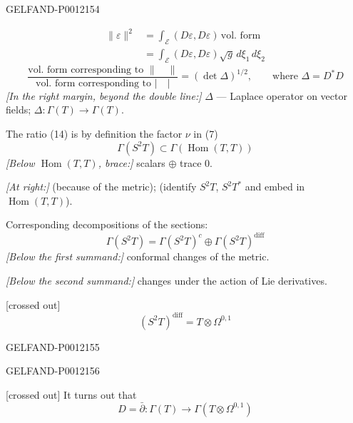 \begin{GelfandAdjacentEvidence}{GELFAND-P001215}{4}

\begin{equation*}
\begin{aligned}
\|\varepsilon\|^2
&=\int_{\mathcal E}(D\varepsilon,D\varepsilon)\,\text{vol. form}\\
&=\int_{\mathcal E}(D\varepsilon,D\varepsilon)\sqrt g\,d\xi_1\,d\xi_2
\end{aligned}\tag{13}
\end{equation*}
\begin{equation*}
\frac{\text{vol. form corresponding to }\|\quad\|}{\text{vol. form corresponding to }\lvert\quad\rvert}
=(\det\Delta)^{1/2},\qquad\text{where }\Delta=D^*D\tag{14}
\end{equation*}
\textit{[In the right margin, beyond the double line:]} \(\Delta\) --- Laplace operator on vector fields;
\(\Delta:\Gamma(T)\to\Gamma(T)\).

The ratio (14) is by definition the factor \(\nu\) in (7)
\[
\Gamma(S^2T)\subset\Gamma(\operatorname{Hom}(T,T))
\]
\textit{[Below \(\operatorname{Hom}(T,T)\), brace:]} scalars \(\oplus\) trace 0.

\textit{[At right:]} (because of the metric); (identify \(S^2T\), \(S^2T^*\) and embed in \(\operatorname{Hom}(T,T)\)).

Corresponding decompositions of the sections:
\begin{equation*}
\Gamma(S^2T)=\Gamma(S^2T)^c\oplus\Gamma(S^2T)^{\mathrm{diff}}\tag{15}
\end{equation*}
\textit{[Below the first summand:]} conformal changes of the metric.

\textit{[Below the second summand:]} changes under the action of Lie derivatives.

[crossed out]
\begin{equation*}
(S^2T)^{\mathrm{diff}}=T\otimes\Omega^{0,1}\tag{16}
\end{equation*}
\end{GelfandAdjacentEvidence}
\begin{GelfandAdjacentEvidence}{GELFAND-P001215}{5}

\end{GelfandAdjacentEvidence}
\begin{GelfandAdjacentEvidence}{GELFAND-P001215}{6}


[crossed out] It turns out that
\begin{equation*}
D=\bar\partial:\Gamma(T)\longrightarrow\Gamma(T\otimes\Omega^{0,1})\tag{17}
\end{equation*}
\end{GelfandAdjacentEvidence}


